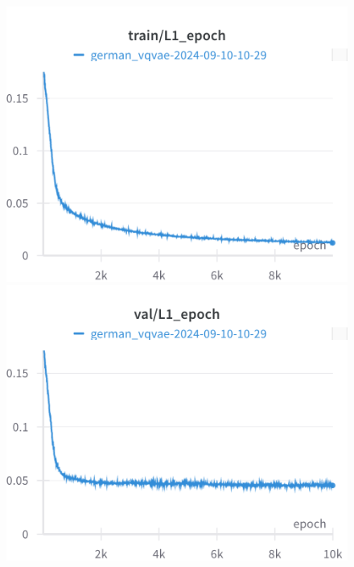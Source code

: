 
\begin{figure}[H]
\includegraphics[width=\linewidth]{detailed_engineering/German VQVAE/charts/train_l1.png}
\caption{}
\endminipage\hfill
{}
\includegraphics[width=\linewidth]{detailed_engineering/German VQVAE/charts/val_l1.png}
\caption{}
\endminipage
\end{figure}


